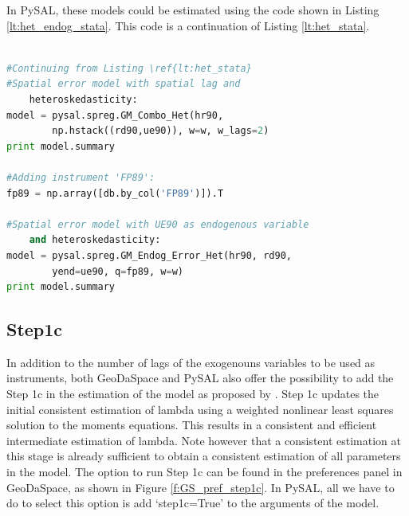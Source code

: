\documentclass{article}
\begin{document}
In PySAL, these models could be estimated using the code shown in Listing \ref{lt:het_endog_stata}. This code is a continuation of Listing \ref{lt:het_stata}.

\begin{code}
\begin{lstlisting}[label=lt:het_endog_stata,caption=Using PySAL to match the results of spatial error models with heteroskedasticity and endogenous variables or spatial lag from Stata,language=Python]

#Continuing from Listing \ref{lt:het_stata}
#Spatial error model with spatial lag and
    heteroskedasticity:
model = pysal.spreg.GM_Combo_Het(hr90,
        np.hstack((rd90,ue90)), w=w, w_lags=2)
print model.summary

#Adding instrument 'FP89':
fp89 = np.array([db.by_col('FP89')]).T

#Spatial error model with UE90 as endogenous variable
    and heteroskedasticity:
model = pysal.spreg.GM_Endog_Error_Het(hr90, rd90,
        yend=ue90, q=fp89, w=w)
print model.summary

\end{lstlisting}
\end{code}

\subsection{Step1c}
\label{s:step1c}
In addition to the number of lags of the exogenouns variables to be used as instruments, both GeoDaSpace and PySAL also offer the possibility to add the Step 1c in the estimation of the model as proposed by \citet{Arraiz10}. Step 1c updates the initial consistent estimation of lambda using a weighted nonlinear least squares solution to the moments equations. This results in a consistent and efficient intermediate estimation of lambda. Note however that a consistent estimation at this stage is already sufficient to obtain a consistent estimation of all parameters in the model. The option to run Step 1c can be found in the preferences panel in GeoDaSpace, as shown in Figure \ref{f:GS_pref_step1c}. In PySAL, all we have to do to select this option is add `step1c=True' to the arguments of the model.
\end{document}

